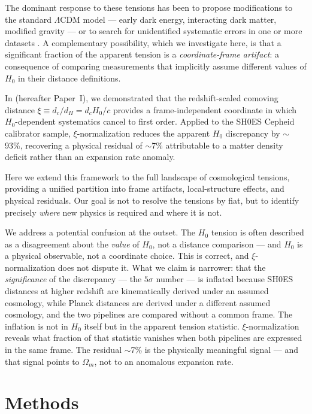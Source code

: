 \documentclass[twocolumn]{aastex631}
\begin{document}
The dominant response to these tensions has been to propose modifications to the
standard $\Lambda$CDM model --- early dark energy, interacting dark matter,
modified gravity --- or to search for unidentified systematic errors in one or more
datasets \citep{DiValentino2021}.
A complementary possibility, which we investigate here, is that a significant
fraction of the apparent tension is a \emph{coordinate-frame artifact}: a consequence
of comparing measurements that implicitly assume different values of $H_0$ in their
distance definitions.

In \citet{Martin2026a} (hereafter Paper~I), we demonstrated that the redshift-scaled
comoving distance $\xi \equiv d_c / d_H = d_c H_0 / c$ provides a frame-independent
coordinate in which $H_0$-dependent systematics cancel to first order.
Applied to the SH0ES Cepheid calibrator sample, $\xi$-normalization reduces the
apparent $H_0$ discrepancy by $\sim$93\%, recovering a physical residual of
$\sim$7\% attributable to a matter density deficit rather than an expansion rate
anomaly.

Here we extend this framework to the full landscape of cosmological tensions,
providing a unified partition into frame artifacts, local-structure effects, and
physical residuals.
Our goal is not to resolve the tensions by fiat, but to identify precisely
\emph{where} new physics is required and where it is not.

We address a potential confusion at the outset.
The $H_0$ tension is often described as a disagreement about the \emph{value}
of $H_0$, not a distance comparison --- and $H_0$ is a physical observable,
not a coordinate choice.
This is correct, and $\xi$-normalization does not dispute it.
What we claim is narrower: that the \emph{significance} of the discrepancy ---
the $5\sigma$ number --- is inflated because SH0ES distances at higher
redshift are kinematically derived under an assumed cosmology, while Planck
distances are derived under a different assumed cosmology, and the two pipelines
are compared without a common frame.
The inflation is not in $H_0$ itself but in the apparent tension statistic.
$\xi$-normalization reveals what fraction of that statistic vanishes when both
pipelines are expressed in the same frame.
The residual $\sim$7\% is the physically meaningful signal --- and that signal
points to $\Omega_m$, not to an anomalous expansion rate.


\section{Methods}
\end{document}
